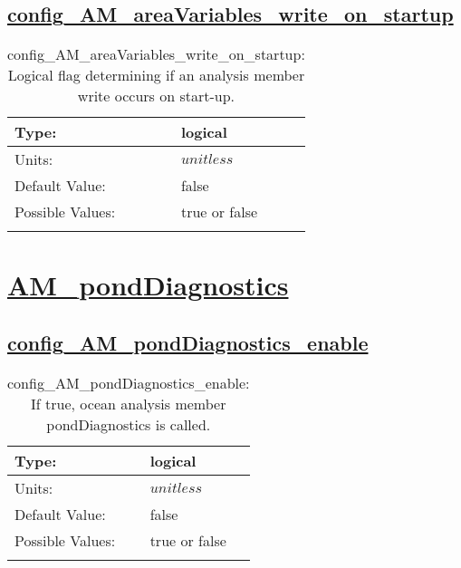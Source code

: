 \subsection[config\_AM\_areaVariables\_write\_on\_startup]{\hyperref[sec:nm_tab_AM_areaVariables]{config\_AM\_areaVariables\_write\_on\_startup}}
\label{subsec:nm_sec_config_AM_areaVariables_write_on_startup}
\begin{center}
\begin{longtable}{| p{2.0in} || p{4.0in} |}
    \hline
    Type: & logical \\
    \hline
    Units: & $unitless$ \\
    \hline
    Default Value: & false \\
    \hline
    Possible Values: & true or false \\
    \hline
    \caption{config\_AM\_areaVariables\_write\_on\_startup: Logical flag determining if an analysis member write occurs on start-up.}
\end{longtable}
\end{center}
\section[AM\_pondDiagnostics]{\hyperref[sec:nm_tab_AM_pondDiagnostics]{AM\_pondDiagnostics}}
\label{sec:nm_sec_AM_pondDiagnostics}
\subsection[config\_AM\_pondDiagnostics\_enable]{\hyperref[sec:nm_tab_AM_pondDiagnostics]{config\_AM\_pondDiagnostics\_enable}}
\label{subsec:nm_sec_config_AM_pondDiagnostics_enable}
\begin{center}
\begin{longtable}{| p{2.0in} || p{4.0in} |}
    \hline
    Type: & logical \\
    \hline
    Units: & $unitless$ \\
    \hline
    Default Value: & false \\
    \hline
    Possible Values: & true or false \\
    \hline
    \caption{config\_AM\_pondDiagnostics\_enable: If true, ocean analysis member pondDiagnostics is called.}
\end{longtable}
\end{center}
